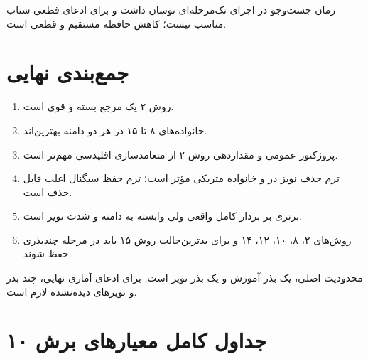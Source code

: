 \documentclass[a4paper,12pt]{article}
\begin{document}
زمان جست‌وجو در اجرای تک‌مرحله‌ای نوسان داشت و برای ادعای قطعی شتاب مناسب نیست؛ کاهش حافظه مستقیم و قطعی است.

\section{جمع‌بندی نهایی}
\begin{enumerate}
\item روش ۲ یک مرجع بسته و قوی است.
\item خانواده‌های ۸ تا ۱۵ در هر دو دامنه بهترین‌اند.
\item پروژکتور عمومی و مقداردهی روش ۲ از متعامدسازی اقلیدسی مهم‌تر است.
\item ترم حذف نویز در  و خانواده متریکی  مؤثر است؛ ترم حفظ سیگنال اغلب قابل حذف است.
\item برتری بر بردار کامل واقعی ولی وابسته به دامنه و شدت نویز است.
\item روش‌های ۲، ۸، ۱۰، ۱۲، ۱۴ و برای بدترین‌حالت روش ۱۵ باید در مرحله چندبذری حفظ شوند.
\end{enumerate}
محدودیت اصلی، یک بذر آموزش و یک بذر نویز است. برای ادعای آماری نهایی، چند بذر و نویزهای دیده‌نشده لازم است.

\appendix
\section{جداول کامل معیارهای برش ۱۰}
\end{document}
